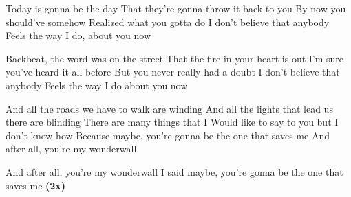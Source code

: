 \begin{verse*}
Today is gonna be the day
That they're gonna throw it back to you
By now you should've somehow
Realized what you gotta do
I don't believe that anybody
Feels the way I do, about you now
\end{verse*}

\begin{verse*}
Backbeat, the word was on the street
That the fire in your heart is out
I'm sure you've heard it all before
But you never really had a doubt
I don't believe that anybody
Feels the way I do about you now
\end{verse*}

\begin{chorus}
And all the roads we have to walk are winding
And all the lights that lead us there are blinding
There are many things that I
Would like to say to you but I don't know how
Because maybe, you're gonna be the one that saves me
And after all, you're my wonderwall
\end{chorus}

\thechorus

\begin{verse*}
And after all, you're my wonderwall
I said maybe, you're gonna be the one that saves me \textbf{(2x)}
\end{verse*}